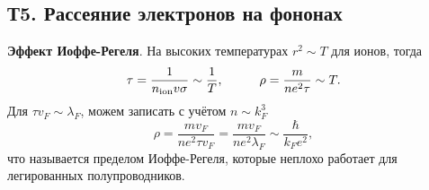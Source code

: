\subsection*{Т5. Рассеяние электронов на фононах}


\textbf{Эффект Иоффе-Регеля}. На высоких температурах $r^2 \sim T$ для ионов, тогда
\begin{equation*}
	\tau = \frac{1}{\sub{n}{ion} v \sigma} \sim \frac{1}{T},
	\hspace{10 mm} 
	\rho = \frac{m}{n e^2 \tau} \sim T.
\end{equation*}
Для $\tau v_F \sim \lambda_F$, можем записать с учётом $n \sim k_F^3$
\begin{equation*}
	\rho = \frac{m v_F}{n e^2 \tau v_F} = \frac{m v_F}{n e^2 \lambda_F} \sim \frac{\hbar}{k_F e^2},
\end{equation*}
что называется пределом Иоффе-Регеля, которые неплохо работает для легированных полупроводников. 


